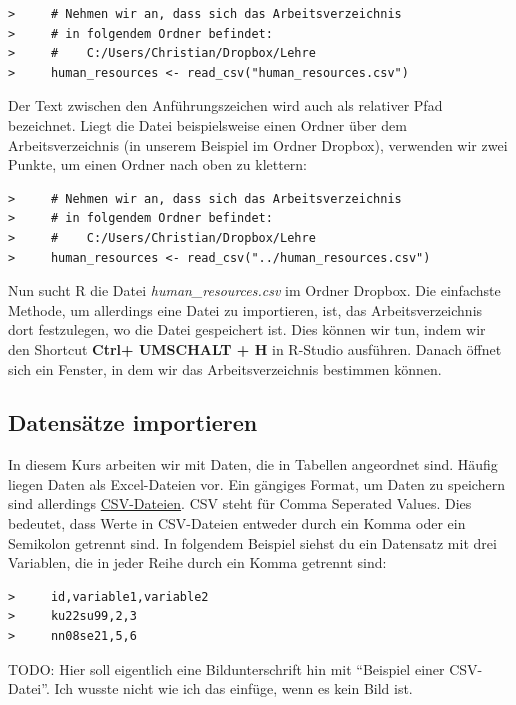 \documentclass[
]{book}
\begin{document}
\begin{verbatim}
>     # Nehmen wir an, dass sich das Arbeitsverzeichnis 
>     # in folgendem Ordner befindet: 
>     #    C:/Users/Christian/Dropbox/Lehre
>     human_resources <- read_csv("human_resources.csv")
\end{verbatim}

Der Text zwischen den Anführungszeichen wird auch als relativer Pfad bezeichnet. Liegt die Datei beispielsweise einen Ordner über dem Arbeitsverzeichnis (in unserem Beispiel im Ordner Dropbox), verwenden wir zwei Punkte, um einen Ordner nach oben zu klettern:

\begin{verbatim}
>     # Nehmen wir an, dass sich das Arbeitsverzeichnis 
>     # in folgendem Ordner befindet: 
>     #    C:/Users/Christian/Dropbox/Lehre
>     human_resources <- read_csv("../human_resources.csv")
\end{verbatim}

Nun sucht R die Datei \emph{human\_resources.csv} im Ordner Dropbox. Die einfachste Methode, um allerdings eine Datei zu importieren, ist, das Arbeitsverzeichnis dort festzulegen, wo die Datei gespeichert ist. Dies können wir tun, indem wir den Shortcut \textbf{Ctrl+ UMSCHALT + H} in R-Studio ausführen. Danach öffnet sich ein Fenster, in dem wir das Arbeitsverzeichnis bestimmen können.

\hypertarget{datensuxe4tze-importieren}{%
\subsection{Datensätze importieren}\label{datensuxe4tze-importieren}}

In diesem Kurs arbeiten wir mit Daten, die in Tabellen angeordnet sind. Häufig liegen Daten als Excel-Dateien vor. Ein gängiges Format, um Daten zu speichern sind allerdings \href{https://de.wikipedia.org/wiki/CSV_(Dateiformat)}{CSV-Dateien}. CSV steht für Comma Seperated Values. Dies bedeutet, dass Werte in CSV-Dateien entweder durch ein Komma oder ein Semikolon getrennt sind. In folgendem Beispiel siehst du ein Datensatz mit drei Variablen, die in jeder Reihe durch ein Komma getrennt sind:

\begin{verbatim}
>     id,variable1,variable2
>     ku22su99,2,3
>     nn08se21,5,6
\end{verbatim}

TODO: Hier soll eigentlich eine Bildunterschrift hin mit ``Beispiel einer CSV-Datei''. Ich wusste nicht wie ich das einfüge, wenn es kein Bild ist.
\end{document}
